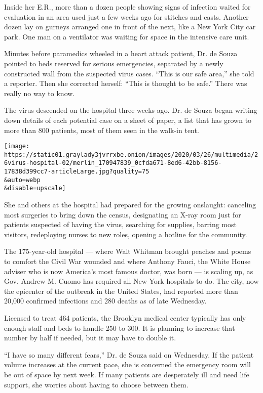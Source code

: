 Inside her E.R., more than a dozen people showing signs of infection
waited for evaluation in an area used just a few weeks ago for stitches
and casts. Another dozen lay on gurneys arranged one in front of the
next, like a New York City car park. One man on a ventilator was waiting
for space in the intensive care unit.

Minutes before paramedics wheeled in a heart attack patient, Dr. de
Souza pointed to beds reserved for serious emergencies, separated by a
newly constructed wall from the suspected virus cases. ``This is our
safe area,'' she told a reporter. Then she corrected herself: ``This is
thought to be safe.'' There was really no way to know.

The virus descended on the hospital three weeks ago. Dr. de Souza began
writing down details of each potential case on a sheet of paper, a list
that has grown to more than 800 patients, most of them seen in the
walk-in tent.

\texttt{[image: https://static01.graylady3jvrrxbe.onion/images/2020/03/26/multimedia/26virus-hospital-02/merlin\_170947839\_0cfda671-8ed6-42bb-8156-17838d399cc7-articleLarge.jpg?quality=75\\\&auto=webp\\\&disable=upscale]}

She and others at the hospital had prepared for the growing onslaught:
canceling most surgeries to bring down the census, designating an X-ray
room just for patients suspected of having the virus, searching for
supplies, barring most visitors, redeploying nurses to new roles,
opening a hotline for the community.

The 175-year-old hospital --- where Walt Whitman brought peaches and
poems to comfort the Civil War wounded and where Anthony Fauci, the
White House adviser who is now America's most famous doctor, was born
--- is scaling up, as Gov. Andrew M. Cuomo has required all New York
hospitals to do. The city, now the epicenter of the outbreak in the
United States, had reported more than 20,000 confirmed infections and
280 deaths as of late Wednesday.

Licensed to treat 464 patients, the Brooklyn medical center typically
has only enough staff and beds to handle 250 to 300. It is planning to
increase that number by half if needed, but it may have to double it.

``I have so many different fears,'' Dr. de Souza said on Wednesday. If
the patient volume increases at the current pace, she is concerned the
emergency room will be out of space by next week. If many patients are
desperately ill and need life support, she worries about having to
choose between them.

